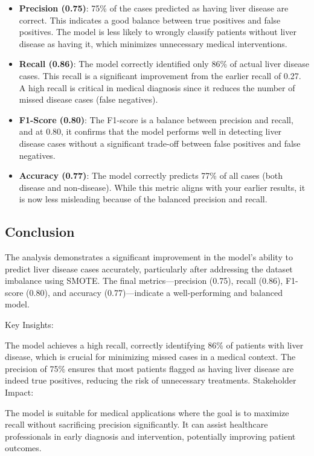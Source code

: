 \documentclass[11pt]{article}
\providecommand{\tightlist}{%
      \setlength{\itemsep}{0pt}\setlength{\parskip}{0pt}}
\begin{document}
\begin{itemize}
\tightlist
\item
  \textbf{Precision (0.75)}: 75\% of the cases predicted as having liver
  disease are correct. This indicates a good balance between true
  positives and false positives. The model is less likely to wrongly
  classify patients without liver disease as having it, which minimizes
  unnecessary medical interventions.
\item
  \textbf{Recall (0.86)}: The model correctly identified only 86\% of
  actual liver disease cases. This recall is a significant improvement
  from the earlier recall of 0.27. A high recall is critical in medical
  diagnosis since it reduces the number of missed disease cases (false
  negatives).
\item
  \textbf{F1-Score (0.80)}: The F1-score is a balance between precision
  and recall, and at 0.80, it confirms that the model performs well in
  detecting liver disease cases without a significant trade-off between
  false positives and false negatives.
\item
  \textbf{Accuracy (0.77)}: The model correctly predicts 77\% of all
  cases (both disease and non-disease). While this metric aligns with
  your earlier results, it is now less misleading because of the
  balanced precision and recall.
\end{itemize}

\subsection{Conclusion}\label{conclusion}

The analysis demonstrates a significant improvement in the model's
ability to predict liver disease cases accurately, particularly after
addressing the dataset imbalance using SMOTE. The final
metrics---precision (0.75), recall (0.86), F1-score (0.80), and accuracy
(0.77)---indicate a well-performing and balanced model.

Key Insights:

The model achieves a high recall, correctly identifying 86\% of patients
with liver disease, which is crucial for minimizing missed cases in a
medical context. The precision of 75\% ensures that most patients
flagged as having liver disease are indeed true positives, reducing the
risk of unnecessary treatments. Stakeholder Impact:

The model is suitable for medical applications where the goal is to
maximize recall without sacrificing precision significantly. It can
assist healthcare professionals in early diagnosis and intervention,
potentially improving patient outcomes.


    
    
    
\end{document}
